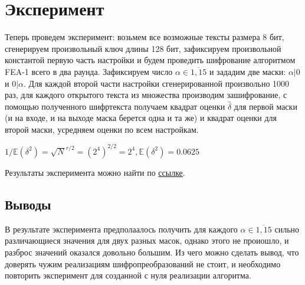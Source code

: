 \documentclass[utf8x, 14pt]{G7-32} %
\begin{document}
\chapter{Эксперимент}
Теперь проведем эксперимент: возьмем все возможные тексты размера 8 бит, сгенерируем произвольный ключ длины 128 бит, зафиксируем произвольной константой первую часть настройки и будем проведить шифрование алгоритмом FEA-1 всего в два раунда. Зафиксируем число $\alpha \in \overline{1,15}$ и зададим две маски: $\alpha|0$ и $0|\alpha$. Для каждой второй части настройки сгенерированной произвольно 1000 раз, для каждого открытого текста из множества производим зашифрование, с помощью полученного шифртекста получаем квадрат оценки $\hat{\delta}$ для первой маски (и на входе, и на выходе маска берется одна и та же) и квадрат оценки для второй маски, усредняем оценки по всем настройкам. 

$1/\mathbb{E}(\delta^2)=\sqrt{N}^{r/2} = (2^4)^{2/2} = 2^4, \mathbb{E}(\delta^2) = 0.0625$

Результаты эксперимента можно найти по \href{https://github.com/jerrydie/course_work}{ссылке}.

\section{Выводы}
В результате эксперимента предполаалось получить для каждого $\alpha \in \overline{1,15}$ сильно различающиеся значения для двух разных масок, однако этого не проиошло, и разброс значений оказался довольно большим. Из чего можно сделать вывод, что доверять чужим реализациям шифропреобразований не стоит, и необходимо повторить эксперимент для созданной с нуля реализации алгоритма.





\backmatter %





%

%
\end{document}

